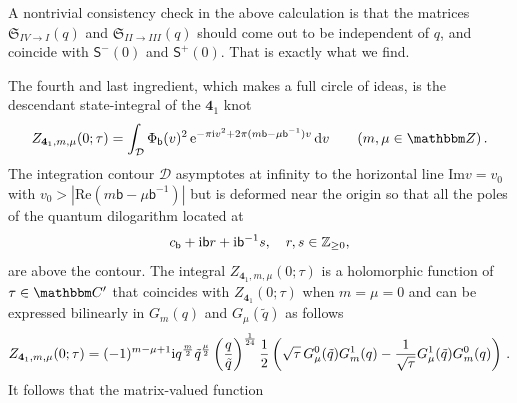 \documentclass[12pt,reqno]{amsart}
\theoremstyle{definition}
\def\BZ{\mathbbm Z}
\def\BC{\mathbbm C}
\def\IZ{\mathbb{Z}}
\def\tq{\tilde{q}}
\def\-{\,-\,}
\def\bb{\mathsf{b}}
\def\ri{\mathrm{i}}
\def\rd{\mathrm{d}}
\def\re{{\rm e}}
\def\ri{{\rm i}}
\def\rd{{\rm d}}
\def\mc{\mathcal}
\def\md{\mathbf}
\def\mfS{\mathfrak{S}}
\def\ms{\mathsf}
\def\IZ{\mathbb{Z}}
\newcommand{\knot}[1]{\md{#1}}
\begin{document}
A nontrivial consistency check in the above calculation is that the
matrices $\mfS_{IV\rightarrow I}(q)$ and $\mfS_{II\rightarrow III}(q)$
should come out to be independent of $q$, and coincide with
$\ms{S}^-(0)$ and $\ms{S}^+(0)$. That is exactly what we find.

The fourth and last ingredient, which makes a full circle of ideas, is
the descendant state-integral of the $\knot{4}_1$ knot
\begin{equation}
\label{Z410-desc}
Z_{\knot{4}_1,m,\mu}(0;\tau) = 
\int_{\mc{D}} \Phi_\bb(v)^2 \, \re^{-\pi \ri v^2
+ 2\pi(m \bb - \mu \bb^{-1})v} \, \rd v \qquad
(m, \mu \in \BZ) \,.
\end{equation}
%
The integration contour $\mc{D}$ asymptotes at infinity to the horizontal line
$\text{Im}{v} = v_0$ with $v_0 >|\text{Re}(m\bb-\mu\bb^{-1})|$ but is deformed
near the origin so that all the poles of the quantum dilogarithm
located at
\begin{equation}
  c_\bb + \ri\bb r +\ri \bb^{-1}s,\quad r,s\in\IZ_{\geq 0},
\end{equation}
are above the contour.
The integral $Z_{\knot{4}_1,m,\mu}(0;\tau)$ is a holomorphic function of $\tau \in \BC'$ that coincides with
$Z_{\knot{4}_1}(0;\tau)$ when $m=\mu=0$ and can be expressed bilinearly
in $G_m(q)$ and $G_\mu(\tq)$ as follows
\begin{equation}
  \label{410-desc-fac}
  Z_{\knot{4}_1,m,\mu}(0;\tau) 
  =
  (-1)^{m-\mu+1}\ri q^{\frac{m}{2}}\tq^{\frac{\mu}{2}} 
  \left(\frac{q}{\tq}\right)^{\frac{1}{24}} \frac{1}{2}
  \left(\sqrt{\tau} \,G^0_\mu(\tq) G^1_m(q) - \frac{1}{\sqrt{\tau}}
    G^1_\mu(\tq) G^0_m(q)\right) \,.
\end{equation}
It follows that the matrix-valued function 
\end{document}
